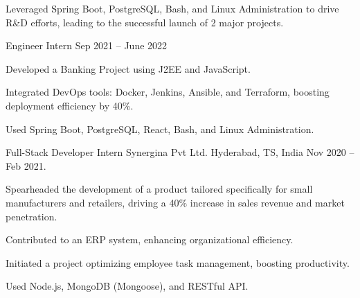 \begin{cventries}
{\begin{cvitems}
            \item {Leveraged Spring Boot, PostgreSQL, Bash, and Linux Administration to drive R\&D efforts, leading to the successful launch of 2 major projects.}
      \end{cvitems}
    }
     \cventry
    {Engineer Intern} %
    {} %
    {} %
    {Sep 2021 – June 2022} %
    {
      \begin{cvitems} %
        \item {Developed a Banking Project using J2EE and JavaScript.}
        \item {Integrated DevOps tools: Docker, Jenkins, Ansible, and Terraform, boosting deployment efficiency by 40\%.}
         \item {Used Spring Boot, PostgreSQL, React, Bash, and Linux Administration.}
      \end{cvitems}
    }   
     \cventry
    {Full-Stack Developer Intern} %
    {Synergina Pvt Ltd.} %
    {Hyderabad, TS, India} %
    {Nov 2020 – Feb 2021.} %
    {
      \begin{cvitems} %
        \item {Spearheaded the development of a product tailored specifically for small manufacturers and retailers, driving a 40\% increase in sales revenue and market penetration.}
        \item {Contributed to an ERP system, enhancing organizational efficiency.}
         \item {Initiated a project optimizing employee task management, boosting productivity.}
          \item {Used Node.js, MongoDB (Mongoose), and RESTful API.}

\end{cvitems}}
\end{cventries}
